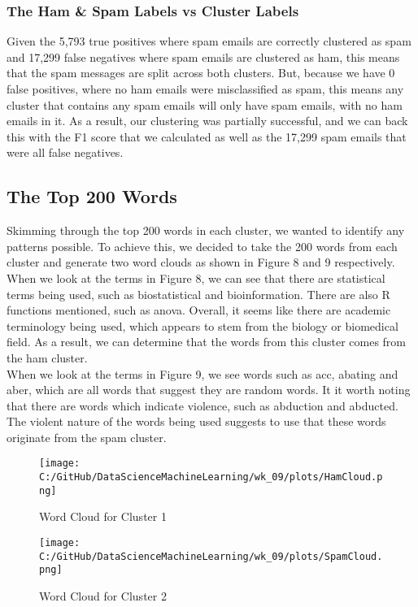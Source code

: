 \documentclass[a4paper, twocolumn]{article}
\begin{document}
\subsubsection{The Ham \& Spam Labels vs Cluster Labels}
Given the 5,793 true positives where spam emails are correctly clustered as spam and 17,299 false negatives where spam emails are clustered as ham, this 
means that the spam messages are split across both clusters. But, because we have 0 false positives, where no ham emails were misclassified as spam, this 
means any cluster that contains any spam emails will only have spam emails, with no ham emails in it. As a result, our clustering was partially successful, 
and we can back this with the F1 score that we calculated as well as the 17,299 spam emails that were all false negatives.

\subsection{The Top 200 Words}
Skimming through the top 200 words in each cluster, we wanted to identify any patterns possible. To achieve this, we decided to take the 200 words from each
cluster and generate two word clouds as shown in Figure 8 and 9 respectively. \\

\noindent When we look at the terms in Figure 8, we can see that there are statistical terms being used, such as biostatistical and bioinformation. There are
also R functions mentioned, such as anova. Overall, it seems like there are academic terminology being used, which appears to stem from the biology or 
biomedical field. As a result, we can determine that the words from this cluster comes from the ham cluster. \\

\noindent When we look at the terms in Figure 9, we see words such as acc, abating and aber, which are all words that suggest they are random words. It it 
worth noting that there are words which indicate violence, such as abduction and abducted. The violent nature of the words being used suggests to use that
these words originate from the spam cluster.

\newpage

\begin{figure}[H]
    \centering
    \texttt{[image: C:/GitHub/DataScienceMachineLearning/wk\_09/plots/HamCloud.png]}
    \caption{Word Cloud for Cluster 1}
\end{figure}

\vspace{2em}


\begin{figure}[H]
    \centering
    \texttt{[image: C:/GitHub/DataScienceMachineLearning/wk\_09/plots/SpamCloud.png]}
    \caption{Word Cloud for Cluster 2}
\end{figure}
\end{document}
